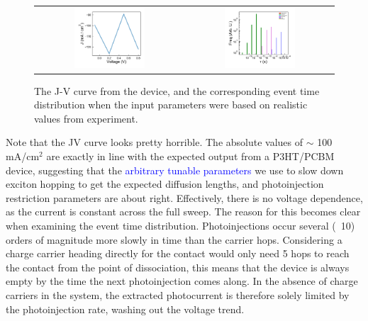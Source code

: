 \documentclass[12pt]{article}
\begin{document}
\begin{figure}[h!]\centering
	\begin{tabular}{cc}
		\includegraphics[width=0.5\textwidth]{Figures/firstJV.pdf}&
		\includegraphics[width=0.5\textwidth]{Figures/firstEventTime.pdf}\\
	\end{tabular}
    \caption{The J-V curve from the device, and the corresponding event time distribution when the input parameters were based on realistic values from experiment.}
	\label{fig:device1}
\end{figure}


Note that the JV curve looks pretty horrible. 
The absolute values of $\sim$ 100 mA/cm$^{2}$ are exactly in line with the expected output from a P3HT/PCBM device, suggesting that the \textcolor{blue}{arbitrary tunable parameters} we use to slow down exciton hopping to get the expected diffusion lengths, and photoinjection restriction parameters are about right.
Effectively, there is no voltage dependence, as the current is constant across the full sweep.
The reason for this becomes clear when examining the event time distribution.
Photoinjections occur several (~10) orders of magnitude more slowly in time than the carrier hops.
Considering a charge carrier heading directly for the contact would only need 5 hops to reach the contact from the point of dissociation, this means that the device is always empty by the time the next photoinjection comes along.
In the absence of charge carriers in the system, the extracted photocurrent is therefore solely limited by the photoinjection rate, washing out the voltage trend.
\end{document}
